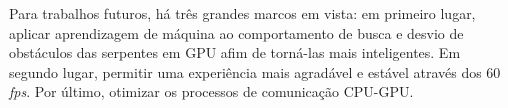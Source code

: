 \documentclass[conference]{IEEEtran}
\begin{document}
Para trabalhos futuros, há três grandes marcos em vista: em primeiro lugar, aplicar aprendizagem de máquina ao comportamento de busca e desvio de obstáculos das serpentes em GPU afim de torná-las mais inteligentes. Em segundo lugar, permitir uma experiência mais agradável e estável através dos 60 \textit{fps}. Por último, otimizar os processos de comunicação CPU-GPU.




\end{document}
